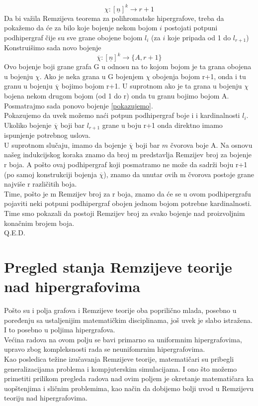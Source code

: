 \documentclass[a4paper]{article}
\begin{document}
\begin{description}
		\begin{equation}\label{pokazujemo}
		\chi : [\underline{n}]^k \rightarrow r+1
		\end{equation}
		Da bi važila Remzijeva teorema za polihromatske hipergrafove, treba da pokažemo da će za bilo koje bojenje nekom bojom $i$ postojati potpuni podhipergraf čije su sve grane obojene bojom $l_i$ (za $i$ koje pripada od 1 do $l_{r+1}$) %
		Konstruišimo sada novo bojenje 
		\begin{equation}
			\overline{\chi} : [\underline{n}]^k \rightarrow \{A, r+1\}
		\end{equation}
		Ovo bojenje  boji grane grafa G u odnosu na to kojom bojom je ta grana obojena u bojenju $\chi$. Ako je neka grana u G bojenjem $\chi$ obojenja bojom r+1, onda i tu granu u bojenju $\overline{\chi}$ bojimo bojom r+1. U suprotnom ako je ta grana u bojenju $\chi$ bojena nekom drugom bojom (od 1 do r) onda tu granu bojimo bojom A.\\
		Posmatrajmo sada ponovo bojenje \ref{pokazujemo}.\\
		Pokazujemo da uvek možemo naći potpun podhipergraf boje i i kardinalnosti $l_i$.
		Ukoliko bojenje $\overline{\chi}$ boji bar $l_{r+1}$ grane u boju r+1 onda direktno imamo ispunjenje potrebnog uslova.
		\\
		U suprotnom slučaju, imamo da bojenje $\overline{\chi}$ boji bar $m$ čvorova boje A. Na osnovu našeg indukcijskog koraka znamo da broj m predstavlja Remzijev broj za bojenje r boja. A pošto ovaj podhipergraf koji posmatramo ne može da sadrži boju r+1 (po samoj konstrukciji bojenja $\overline{\chi}$), znamo da unutar ovih m čvorova postoje grane najviše r različitih boja.\\ Time, pošto je m Remzijev broj za r boja, znamo da će se u ovom podhipergrafu pojaviti neki potpuni podhipergraf obojen jednom bojom potrebne kardinalnosti. Time smo pokazali da postoji Remzijev broj za svako bojenje nad proizvoljnim konačnim brojem boja. \\
		Q.E.D.
 	\end{description}
	\section{Pregled stanja Remzijeve teorije nad hipergrafovima}
	Pošto su i polja grafova i Remzijeve teorije oba poprilično mlada, posebno u poređenju sa ustaljenijim matematičkim disciplinama, još uvek je slabo istražena. I to posebno u poljima hipergrafova.\\ Većina radova na ovom polju se bavi primarno sa uniformnim hipergrafovima, upravo zbog kompleksnosti rada se neunifomrnim hipergrafovima.\\ Kao posledica težine izučavanja Remzijeve teorije, matematičari su pribegli generalizacijama problema i kompjuterskim simulacijama. I ono što možemo primetiti prilikom pregleda radova nad ovim poljem je okretanje matematičara ka uopštenjima i sličnim problemima, kao način da dobijemo bolji uvod u Remzijevu teoriju nad hipergrafovima.
\end{document}
